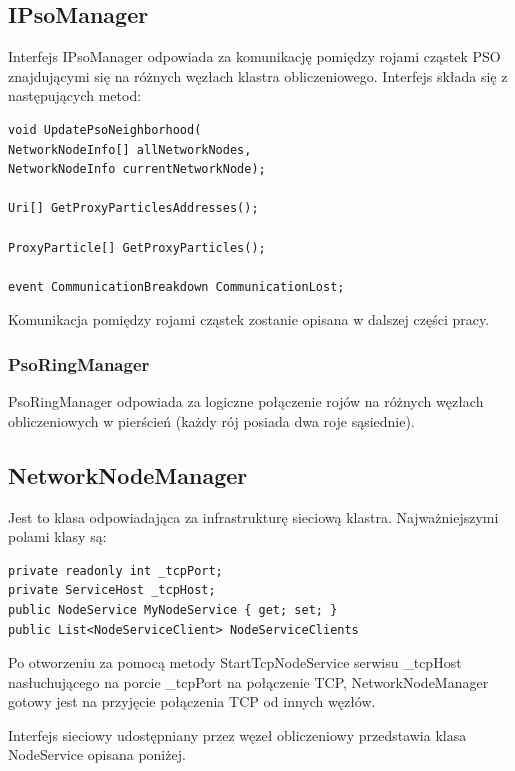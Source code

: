 \documentclass[12pt, twoside, openany, abstract=on]{report}
\theoremstyle{definition}
\begin{document}
\subsection{IPsoManager}

Interfejs IPsoManager odpowiada za komunikację pomiędzy rojami cząstek PSO znajdującymi się na różnych węzłach klastra obliczeniowego. Interfejs składa się z następujących metod:

\begin{lstlisting}[frame=single]
void UpdatePsoNeighborhood(
NetworkNodeInfo[] allNetworkNodes, 
NetworkNodeInfo currentNetworkNode);
  
Uri[] GetProxyParticlesAddresses();

ProxyParticle[] GetProxyParticles();

event CommunicationBreakdown CommunicationLost;
\end{lstlisting}

Komunikacja pomiędzy rojami cząstek zostanie opisana w dalszej części pracy.

\subsubsection{PsoRingManager}
PsoRingManager odpowiada za logiczne połączenie rojów na różnych węzłach obliczeniowych w pierścień (każdy rój posiada dwa roje sąsiednie).


\subsection{NetworkNodeManager}
Jest to klasa odpowiadająca za infrastrukturę sieciową klastra. Najważniejszymi polami klasy są:

\begin{lstlisting}[frame=single]
private readonly int _tcpPort;
private ServiceHost _tcpHost;
public NodeService MyNodeService { get; set; }
public List<NodeServiceClient> NodeServiceClients
\end{lstlisting}

Po otworzeniu za pomocą metody StartTcpNodeService serwisu \_tcpHost nasłuchującego na porcie \_tcpPort na połączenie TCP, NetworkNodeManager gotowy jest na przyjęcie połączenia TCP od innych węzłów. 

Interfejs sieciowy udostępniany przez węzeł obliczeniowy przedstawia klasa NodeService opisana poniżej.
\end{document}
